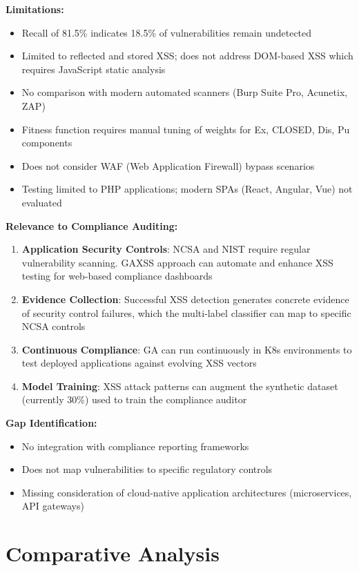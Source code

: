 \documentclass[11pt,conference]{IEEEtran}
\begin{document}
\begin{enumerate}
\textbf{Limitations:}
\begin{itemize}
    \item Recall of 81.5\% indicates 18.5\% of vulnerabilities remain undetected
    \item Limited to reflected and stored XSS; does not address DOM-based XSS which requires JavaScript static analysis
    \item No comparison with modern automated scanners (Burp Suite Pro, Acunetix, ZAP)
    \item Fitness function requires manual tuning of weights for Ex, CLOSED, Dis, Pu components
    \item Does not consider WAF (Web Application Firewall) bypass scenarios
    \item Testing limited to PHP applications; modern SPAs (React, Angular, Vue) not evaluated
\end{itemize}

\textbf{Relevance to Compliance Auditing:}

\begin{enumerate}
    \item \textbf{Application Security Controls}: NCSA and NIST require regular vulnerability scanning. GAXSS approach can automate and enhance XSS testing for web-based compliance dashboards
    \item \textbf{Evidence Collection}: Successful XSS detection generates concrete evidence of security control failures, which the multi-label classifier can map to specific NCSA controls
    \item \textbf{Continuous Compliance}: GA can run continuously in K8s environments to test deployed applications against evolving XSS vectors
    \item \textbf{Model Training}: XSS attack patterns can augment the synthetic dataset (currently 30\%) used to train the compliance auditor
\end{enumerate}

\textbf{Gap Identification:}
\begin{itemize}
    \item No integration with compliance reporting frameworks
    \item Does not map vulnerabilities to specific regulatory controls
    \item Missing consideration of cloud-native application architectures (microservices, API gateways)
\end{itemize}

\section{Comparative Analysis}


\end{enumerate}
\end{document}
